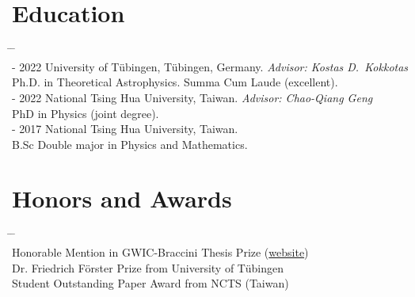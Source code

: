 \documentclass[10pt,floatfix,a4paper]{article}
\begin{document}
\section*{Education}
\begin{tabbing}
  \hspace*{5mm} \= \hspace*{2.3cm} \= \hspace*{10cm} \\[-3ex]
   - 2022 \>  University of T{\"u}bingen, T\"ubingen, Germany. \textit{Advisor: Kostas D.~Kokkotas} \\
  \> \> Ph.D. in Theoretical Astrophysics.  Summa Cum Laude (excellent). \\[1ex]
   - 2022 \> National Tsing Hua University, Taiwan. \textit{Advisor: Chao-Qiang Geng} \\
  \> \> PhD in Physics (joint degree). \\[1ex]
   - 2017 \> National Tsing Hua University, Taiwan. \\
  \> \> B.Sc Double major in Physics and Mathematics.
\end{tabbing}


\section*{Honors and Awards}
\begin{tabbing}
  \hspace*{5mm} \= \hspace*{2.3cm} \= \hspace*{10cm} \\[-3ex]
  \> Honorable Mention in GWIC-Braccini Thesis Prize (\href{https://gwic.ligo.org/thesis-prize.html}{website}) \\
  \> Dr. Friedrich F{\"o}rster Prize from University of T{\"u}bingen \\
  \> Student Outstanding Paper Award from NCTS (Taiwan)
\end{tabbing}
\end{document}
